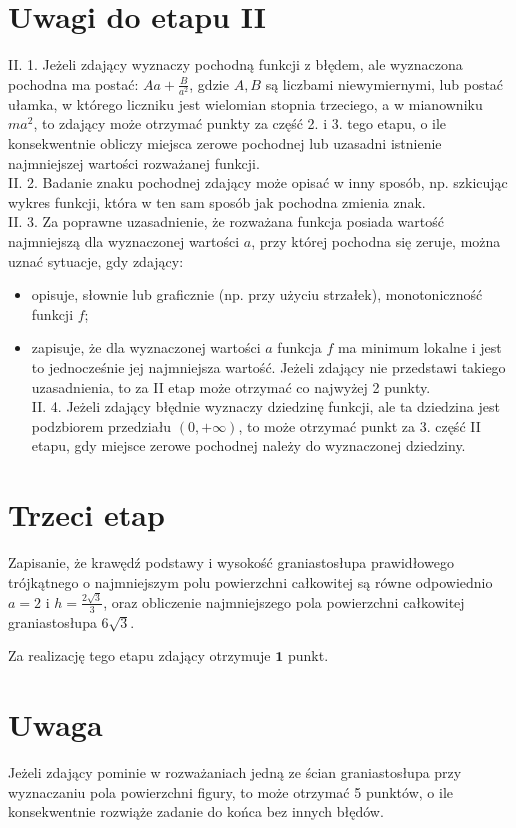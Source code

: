 \documentclass[10pt]{article}
\begin{document}
\section*{Uwagi do etapu II}
II. 1. Jeżeli zdający wyznaczy pochodną funkcji z błędem, ale wyznaczona pochodna ma postać: $A a+\frac{B}{a^{2}}$, gdzie $A, B$ są liczbami niewymiernymi, lub postać ułamka, w którego liczniku jest wielomian stopnia trzeciego, a w mianowniku $m a^{2}$, to zdający może otrzymać punkty za część 2. i 3. tego etapu, o ile konsekwentnie obliczy miejsca zerowe pochodnej lub uzasadni istnienie najmniejszej wartości rozważanej funkcji.\\
II. 2. Badanie znaku pochodnej zdający może opisać w inny sposób, np. szkicując wykres funkcji, która w ten sam sposób jak pochodna zmienia znak.\\
II. 3. Za poprawne uzasadnienie, że rozważana funkcja posiada wartość najmniejszą dla wyznaczonej wartości $a$, przy której pochodna się zeruje, można uznać sytuacje, gdy zdający:

\begin{itemize}
  \item opisuje, słownie lub graficznie (np. przy użyciu strzałek), monotoniczność funkcji $f$;
  \item zapisuje, że dla wyznaczonej wartości $a$ funkcja $f$ ma minimum lokalne i jest to jednocześnie jej najmniejsza wartość. Jeżeli zdający nie przedstawi takiego uzasadnienia, to za II etap może otrzymać co najwyżej 2 punkty.\\
II. 4. Jeżeli zdający błędnie wyznaczy dziedzinę funkcji, ale ta dziedzina jest podzbiorem przedziału $(0,+\infty)$, to może otrzymać punkt za 3. część II etapu, gdy miejsce zerowe pochodnej należy do wyznaczonej dziedziny.
\end{itemize}

\section*{Trzeci etap}
Zapisanie, że krawędź podstawy i wysokość graniastosłupa prawidłowego trójkątnego o najmniejszym polu powierzchni całkowitej są równe odpowiednio $a=2$ i $h=\frac{2 \sqrt{3}}{3}$, oraz obliczenie najmniejszego pola powierzchni całkowitej graniastosłupa $6 \sqrt{3}$.

Za realizację tego etapu zdający otrzymuje $\mathbf{1}$ punkt.

\section*{Uwaga}
Jeżeli zdający pominie w rozważaniach jedną ze ścian graniastosłupa przy wyznaczaniu pola powierzchni figury, to może otrzymać 5 punktów, o ile konsekwentnie rozwiąże zadanie do końca bez innych błędów.
\end{document}
